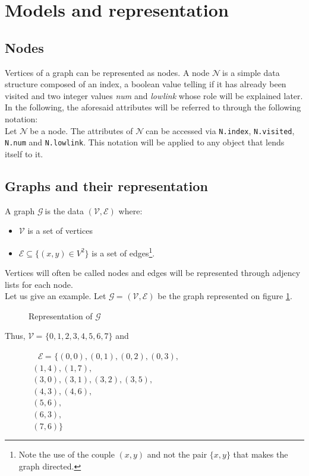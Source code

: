 \documentclass[a4 paper, 12pt]{article}
\theoremstyle{definition}
\def\NN{$\mathcal{N}~$}
\def\GG{$\mathcal{G}~$}
\def\VV{$\mathcal{V}~$}
\def\EE{$\mathcal{E}~$}
\begin{document}
\pagebreak

\section{Models and representation}
\subsection{Nodes}

Vertices of a graph can be represented as nodes.
A node \NN is a simple data structure composed of an index, a boolean value telling if it has already been visited and two integer values \textit{num} and \textit{lowlink} whose role will be explained later.\\
In the following, the aforesaid attributes will be referred to through the following notation:\\
Let \NN be a node. The attributes of \NN can be accessed via \texttt{N.index}, \texttt{N.visited}, \texttt{N.num} and \texttt{N.lowlink}. This notation will be applied to any object that lends itself to it.

\subsection{Graphs and their representation}
A graph \GG is the data $(\mathcal{V}, \mathcal{E})$ where:
\begin{itemize}
    \item $\mathcal{V}$ is a set of vertices
    \item $\mathcal{E} \subseteq \{(x,y) \in V^2\}$ is a set of edges\footnote{Note the use of the couple $(x, y)$ and not the pair $\{x, y\}$ that makes the graph directed.}.
\end{itemize}
Vertices will often be called nodes and edges will be represented through adjency lists for each node.\\
Let us give an example. Let \GG = $(\mathcal{V}, \mathcal{E})$ be the graph represented on figure \ref{fig:graph}.
\begin{figure}[!h]
    \caption{Representation of \GG\label{fig:graph}}
\end{figure}
Thus, \VV = $\{0,1,2,3,4,5,6,7\}$ and
\begin{flushleft}
    ~~~~~~~~\EE = $\{(0,0),(0,1),(0,2),(0,3),$\\
    $~~~~~~~~~~~~~~~(1,4),(1,7),$\\
    $~~~~~~~~~~~~~~~(3,0),(3,1),(3,2),(3,5),$\\
    $~~~~~~~~~~~~~~~(4,3),(4,6),$\\
    $~~~~~~~~~~~~~~~(5,6),$\\
    $~~~~~~~~~~~~~~~(6,3),$\\
    $~~~~~~~~~~~~~~~(7,6)\}$
\end{flushleft}
\end{document}
